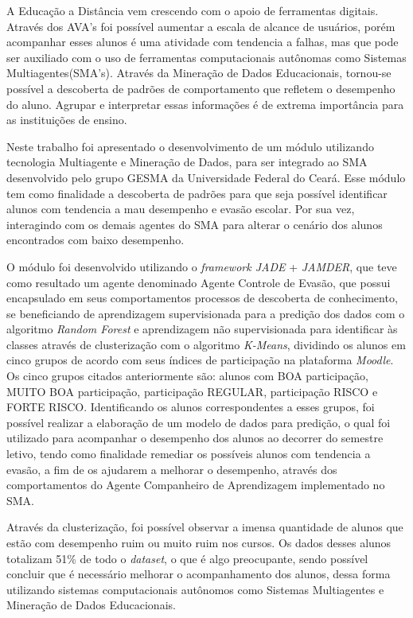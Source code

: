 \label{sec:conclusao}
\iniciocapitulo

\indent A Educação a Distância vem crescendo com o apoio de ferramentas digitais. Através dos AVA's foi possível aumentar a escala de alcance de usuários, porém acompanhar esses alunos é uma atividade com tendencia a falhas, mas que pode ser auxiliado com o uso de ferramentas computacionais autônomas como Sistemas Multiagentes(SMA's). Através da Mineração de Dados Educacionais, tornou-se possível a descoberta de padrões de comportamento que refletem o desempenho do aluno. Agrupar e interpretar essas informações é de extrema importância para as instituições de ensino.

Neste trabalho foi apresentado o desenvolvimento de um módulo utilizando tecnologia Multiagente e Mineração de Dados, para ser integrado ao SMA desenvolvido pelo grupo GESMA da Universidade Federal do Ceará. Esse módulo tem como finalidade a descoberta de padrões para que seja possível identificar alunos com tendencia a mau desempenho e evasão escolar. Por sua vez, interagindo com os demais agentes do SMA para alterar o cenário dos alunos encontrados com baixo desempenho.

O módulo foi desenvolvido utilizando o \textit{framework JADE} + \textit{JAMDER}, que teve como resultado um agente denominado Agente Controle de Evasão, que possui encapsulado em seus comportamentos processos de descoberta de conhecimento, se beneficiando de aprendizagem supervisionada para a predição dos dados com o algoritmo \textit{Random Forest} e aprendizagem não supervisionada para identificar às classes através de clusterização com o algoritmo \textit{K-Means}, dividindo os alunos em cinco grupos de acordo com seus índices de participação na plataforma \textit{Moodle}. Os cinco grupos citados anteriormente são: alunos com BOA participação, MUITO BOA participação, participação REGULAR, participação RISCO e FORTE RISCO. Identificando os alunos correspondentes a esses grupos, foi possível realizar a elaboração de um modelo de dados para predição, o qual foi utilizado para acompanhar o desempenho dos alunos ao decorrer do semestre letivo, tendo como finalidade remediar os possíveis alunos com tendencia a evasão, a fim de os ajudarem a melhorar o desempenho, através dos comportamentos do Agente Companheiro de Aprendizagem implementado no SMA.

Através da clusterização, foi possível observar a imensa quantidade de alunos que estão com desempenho ruim ou muito ruim nos cursos. Os dados desses alunos totalizam 51\% de todo o \textit{dataset}, o que é algo preocupante, sendo possível concluir que é necessário melhorar o acompanhamento dos alunos, dessa forma utilizando sistemas computacionais autônomos como Sistemas Multiagentes e Mineração de Dados Educacionais.

